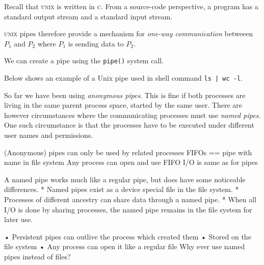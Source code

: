 Recall that \textsc{unix} is written in \textsc{c}. From a source-code perspective, 
a program has a standard output stream and a standard input stream. 


\textsc{unix} pipes therefore provide a mechanism
for \textit{one-way communication} betweeen $P_1$ and $P_2$ where 
$P_1$ is sending data to $P_2$. 

We can create a pipe using the \lstinline{pipe()} system call.




\begin{example}
Below shows an example of a Unix pipe used in shell command \lstinline{ls | wc -l}.

\begin{figure}[h]
\end{figure} 
\end{example}

So far we have been using \textit{anonymous pipes}. This is fine if both 
processes are living in the same parent process space, 
started by the same user. 
There are however circumstances where the communicating processes
must use \textit{named pipes}. One such circumstance is that the processes have to be executed under different user names and permissions.


(Anonymous) pipes can only be used by related 
processes
FIFOs == pipe with name in file system
Any process can open and use FIFO
I/O is same as for pipes

A named pipe works much like a regular pipe, but does have
some noticeable differences.
* Named pipes exist as a device special file in the file
system.
* Processes of different ancestry can share data through a
named pipe.
* When all I/O is done by sharing processes, the named 
pipe remains in the file system for later use.

• Persistent pipes can outlive the process which 
created them
• Stored on the file system
• Any process can open it like a regular file
 Why ever use named pipes instead of files?


